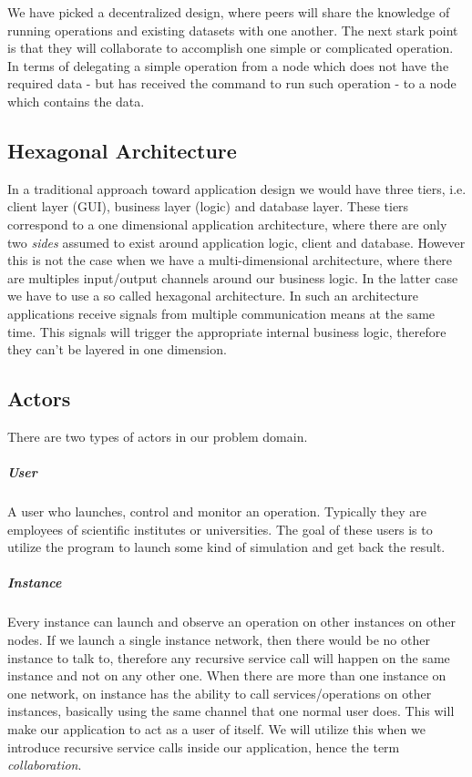 We have picked a decentralized design, where peers will share the knowledge of running operations and existing datasets
with one another. The next stark point is that they will collaborate to accomplish one simple or complicated operation.
In terms of delegating a simple operation from a node which does not have the required data - but has received the command
to run such operation - to a node which contains the data.

\subsection{Hexagonal Architecture}
In a traditional approach toward application design we would have three tiers, i.e. client layer (GUI),
business layer (logic) and database layer. These tiers correspond to a one dimensional application architecture,
where there are only two \textit{sides} assumed to exist around application logic, client and database. However
this is not the case when we have a multi-dimensional architecture, where there are multiples input/output channels
around our business logic. In the latter case we have to use a so called hexagonal architecture. \cite{alistair}
In such an architecture applications receive signals from multiple communication means at the same time. This 
signals will trigger the appropriate internal business logic, therefore they can't be layered in one dimension.

\subsection{Actors}
There are two types of actors in our problem domain.
\subparagraph{User}
A user who launches, control and monitor an operation. Typically they are employees of scientific institutes or universities.
The goal of these users is to utilize the program to launch some kind of simulation and get back the result.
\subparagraph{Instance}
Every instance can launch and observe an operation on other instances on other nodes. If we launch a single instance
network, then there would be no other instance to talk to, therefore any recursive service call will happen on the
same instance and not on any other one.
When there are more than one instance on one network, on instance has the ability to call services/operations on other
instances, basically using the same channel that one normal user does. This will make our application to act as a user
of itself. We will utilize this when we introduce recursive service calls inside our application, hence the term
\textit{collaboration}.

